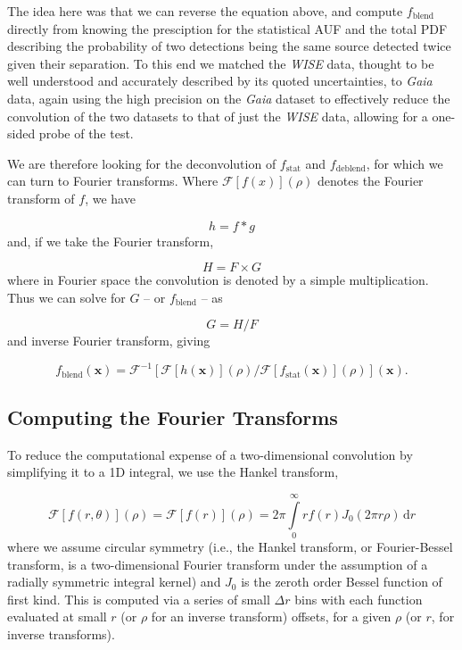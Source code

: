 \documentclass[fleqn,usenatbib]{mnras}
\begin{document}
The idea here was that we can reverse the equation above, and compute $f_\mathrm{blend}$ directly from knowing the presciption for the statistical AUF and the total PDF describing the probability of two detections being the same source detected twice given their separation. To this end we matched the \textit{WISE} data, thought to be well understood and accurately described by its quoted uncertainties, to \textit{Gaia} data, again using the high precision on the \textit{Gaia} dataset to effectively reduce the convolution of the two datasets to that of just the \textit{WISE} data, allowing for a one-sided probe of the test.

We are therefore looking for the deconvolution of $f_\mathrm{stat}$ and $f_\mathrm{deblend}$, for which we can turn to Fourier transforms. Where $\mathcal{F}[f(x)](\rho)$ denotes the Fourier transform of $f$, we have

\begin{equation}
	h = f * g
\end{equation}
and, if we take the Fourier transform,

\begin{equation}
H = F \times G
\end{equation}
where in Fourier space the convolution is denoted by a simple multiplication. Thus we can solve for $G$ -- or $f_\mathrm{blend}$ -- as

\begin{equation}
	G = H / F
\end{equation}
and inverse Fourier transform, giving

\begin{equation}
	f_\mathrm{blend}(\textbf{x}) = \mathcal{F}^{-1}\left[\mathcal{F}[h(\textbf{x})](\rho) / \mathcal{F}[f_\mathrm{stat}(\textbf{x})](\rho)\right](\textbf{x}).
\end{equation}

\subsection{Computing the Fourier Transforms}

To reduce the computational expense of a two-dimensional convolution by simplifying it to a 1D integral, we use the Hankel transform,

\begin{equation}
\mathcal{F}[f(r, \theta)](\rho) = \mathcal{F}[f(r)](\rho) = 2 \pi \int\limits_0^\infty\!r f(r) J_0(2 \pi r \rho)\,\mathrm{d}r
\end{equation}
where we assume circular symmetry (i.e., the Hankel transform, or Fourier-Bessel transform, is a two-dimensional Fourier transform under the assumption of a radially symmetric integral kernel) and $J_0$ is the zeroth order Bessel function of first kind. This is computed via a series of small $\Delta r$ bins with each function evaluated at small $r$ (or $\rho$ for an inverse transform) offsets, for a given $\rho$ (or $r$, for inverse transforms).
\end{document}
